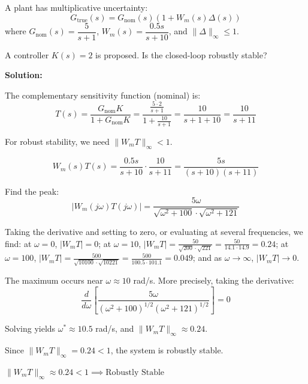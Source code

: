 \begin{examplebox}
A plant has multiplicative uncertainty:
\begin{equation*}
G_{\text{true}}(s) = G_{\text{nom}}(s)(1 + W_m(s)\Delta(s))
\end{equation*}
where $G_{\text{nom}}(s) = \dfrac{5}{s+1}$, $W_m(s) = \dfrac{0.5s}{s+10}$, and $\|\Delta\|_\infty \leq 1$.

A controller $K(s) = 2$ is proposed. Is the closed-loop robustly stable?

\textbf{Solution:}

The complementary sensitivity function (nominal) is:
\begin{equation*}
T(s) = \frac{G_{\text{nom}} K}{1 + G_{\text{nom}} K} = \frac{\frac{5 \cdot 2}{s+1}}{1 + \frac{10}{s+1}} = \frac{10}{s + 1 + 10} = \frac{10}{s + 11}
\end{equation*}

For robust stability, we need $\|W_m T\|_\infty < 1$.

\begin{equation*}
W_m(s) T(s) = \frac{0.5s}{s+10} \cdot \frac{10}{s+11} = \frac{5s}{(s+10)(s+11)}
\end{equation*}

Find the peak:
\begin{equation*}
|W_m(j\omega) T(j\omega)| = \frac{5\omega}{\sqrt{\omega^2+100} \cdot \sqrt{\omega^2+121}}
\end{equation*}

Taking the derivative and setting to zero, or evaluating at several frequencies, we find: at $\omega = 0$, $|W_m T| = 0$; at $\omega = 10$, $|W_m T| = \frac{50}{\sqrt{200} \cdot \sqrt{221}} = \frac{50}{14.1 \cdot 14.9} = 0.24$; at $\omega = 100$, $|W_m T| = \frac{500}{\sqrt{10100} \cdot \sqrt{10221}} = \frac{500}{100.5 \cdot 101.1} = 0.049$; and as $\omega \to \infty$, $|W_m T| \to 0$.

The maximum occurs near $\omega \approx 10$ rad/s. More precisely, taking the derivative:
\begin{equation*}
\frac{d}{d\omega}\left[\frac{5\omega}{(\omega^2+100)^{1/2}(\omega^2+121)^{1/2}}\right] = 0
\end{equation*}

Solving yields $\omega^* \approx 10.5$ rad/s, and $\|W_m T\|_\infty \approx 0.24$.

Since $\|W_m T\|_\infty = 0.24 < 1$, the system is robustly stable.

$\boxed{\|W_m T\|_\infty \approx 0.24 < 1 \implies \text{Robustly Stable}}$
\end{examplebox}

